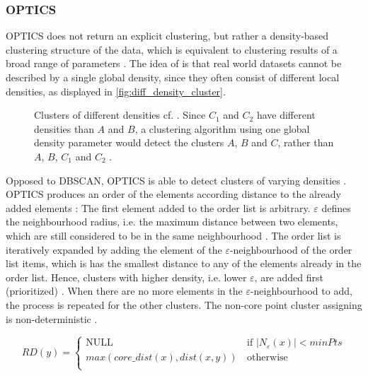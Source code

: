 \subsubsection{OPTICS}\label{subsec:optics}

OPTICS does not return an explicit clustering, but rather a density-based clustering structure of the data, 
which is equivalent to clustering results of a broad range of parameters \cite{OPTICS1999}.
The idea of \citeauthor{OPTICS1999} is that real world datasets cannot be described by a single global density, since they often consist of different local densities, 
as displayed in \autoref{fig:diff_density_cluster}.

\begin{figure}[htp] %
    \centering
    
    \caption{Clusters of different densities cf. \cite{OPTICS1999}.
    Since $C_1$ and $C_2$ have different densities than $A$ and $B$, a clustering algorithm using one global density parameter would detect the clusters $A$, $B$ and $C$, 
    rather than $A$, $B$, $C_1$ and $C_2$ .
    }
    \label{fig:diff_density_cluster}
\end{figure}

Opposed to DBSCAN, OPTICS is able to detect clusters of varying densities \cite{OPTICS2014}.
OPTICS produces an order of the elements according distance to the already added elements \cite{OPTICS2014, OPTICS2013}:
The first element added to the order list is arbitrary.
$\varepsilon$ defines the neighbourhood radius, i.e. the maximum distance between two elements, which are still considered to be in the same neighbourhood \cite{OPTICS_kMeans_2016}.
The order list is iteratively expanded by adding the element of the $\varepsilon$-neighbourhood of the order list items, which is has the smallest distance to any of the elements already in the order list.
Hence, clusters with higher density, i.e. lower $\varepsilon$, are added first (prioritized) \cite{OPTICS_kMeans_2016}.
When there are no more elements in the $\varepsilon$-neighbourhood to add, the process is repeated for the other clusters.
The non-core point cluster assigning is non-deterministic \cite{OPTICS2013}.

\begin{equation}
    RD(y) = \left\{
    \begin{array}{ll}
    \textrm{NULL} & \, \textrm{if |}N_\varepsilon (x)| < minPts \\
    max(core\_dist(x), dist(x,y)) & \, \textrm{otherwise} \\
    \end{array}
    \right. 
    \label{eq:optics-reachability-distance}
\end{equation}

